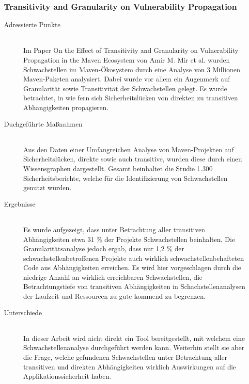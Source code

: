 \subsubsection{Transitivity and Granularity on Vulnerability Propagation} \label{sec:Transitivity}
    \begin{description}
        \item[Adressierte Punkte]\hfill \\
            Im Paper \glqq On the Effect of Transitivity and Granularity on Vulnerability Propagation in the Maven Ecosystem\grqq\cite{article:OnTheEffect10123571} von Amir M. Mir et al. wurden Schwachstellen im Maven-Ökosystem durch eine Analyse von 3 Millionen Maven-Paketen analysiert.
            Dabei wurde vor allem ein Augenmerk auf Granularität sowie Transitivität der Schwachstellen gelegt.
            Es wurde betrachtet, in wie fern sich Sicherheitslücken von direkten zu transitiven Abhängigkeiten propagieren.
        \item[Duchgeführte Maßnahmen]\hfill \\
            Aus den Daten einer Umfangreichen Analyse von Maven-Projekten auf Sicherheitslücken, direkte sowie auch transitive, wurden diese durch einen Wissensgraphen dargestellt.
            Gesamt beinhaltet die Studie 1.300 Sicherheitsberichte, welche für die Identifizierung von Schwachstellen genutzt wurden.
        \item[Ergebnisse]\hfill \\
            Es wurde aufgezeigt, dass unter Betrachtung aller transitiven Abhängigkeiten etwa 31 \% der Projekte Schwachstellen beinhalten.
            Die Granularitätsanalyse jedoch ergab, dass nur 1,2 \% der schwachstellenbetroffenen Projekte auch wirklich schwachstellenbehafteten Code aus Abhängig\-keiten erreichen.
            Es wird hier vorgeschlagen durch die niedrige Anzahl an wirklich erreichbaren Schwachstellen, die Betrachtungstiefe von transitiven Abhängigkeiten in Schachstellenanalysen der Laufzeit und Ressourcen zu gute kommend zu begrenzen.
        \item[Unterschiede]\hfill \\
            In dieser Arbeit wird nicht direkt ein Tool bereitgestellt, mit welchem eine Schwachstellenanalyse durchgeführt werden kann.
            Weiterhin stellt sie aber die Frage, welche gefundenen Schwachstellen unter Betrachtung aller transitiven und direkten Abhängigkeiten wirklich Auswirkungen auf die Applikationssicherheit haben.
    \end{description}